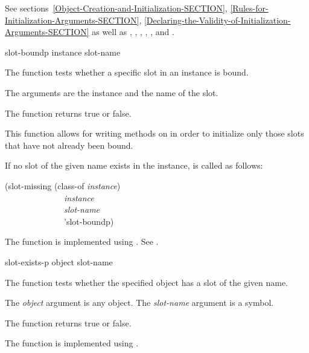 \begin{defun}
See sections~\ref{Object-Creation-and-Initialization-SECTION},
\ref{Rules-for-Initialization-Arguments-SECTION},
\ref{Declaring-the-Validity-of-Initialization-Arguments-SECTION} as well as
,
,
,
,
,
and .
\end{defun}


\begin{defun}[Function]
slot-boundp instance slot-name

The function  tests whether a specific slot in an
instance is bound.





The arguments are the instance and the name of the slot.


The function  returns true or false.


This function allows for writing 
methods on  in order to initialize only
those slots that have not already been bound.

If no slot of the given name exists in the instance, 
is called as follows:
\begin{lisp}
(slot-missing (class-of {\it instance\/}) \\
~~~~~~~~~~~~~~{\it instance\/} \\
~~~~~~~~~~~~~~{\it slot-name\/} \\
~~~~~~~~~~~~~~'slot-boundp)
\end{lisp}

The function  is implemented using 
.
See .
\end{defun}


\begin{defun}[Function]
slot-exists-p object slot-name

The function  tests whether the specified object has
a slot of the given name.





The {\it object\/} argument is any object.  The {\it slot-name\/} argument
is a symbol.


The function  returns true or false.


The function  is implemented using 
.

\end{defun}


